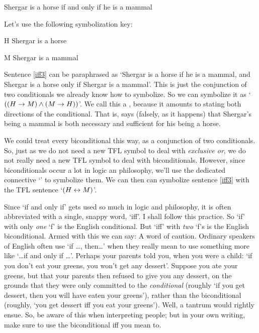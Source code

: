 	\begin{earg}
		\item[\ex{iff3}] Shergar is a horse if and only if he is a mammal
	\end{earg}
Let's use the following symbolization key:
	\begin{ekey}
		\item[H] Shergar is a horse
		\item[M] Shergar is a mammal
	\end{ekey}
Sentence \ref{iff3} can be paraphrased as `Shergar is a horse if he is a mammal, and Shergar is a horse only if Shergar is a mammal'. This is just the conjunction of two conditionals we already know how to symbolize.   So we can symbolize it as `$((H \rightarrow M) \wedge (M \rightarrow H))$'. We call this a , because it amounts to stating both directions of the conditional.  That is,  says (falsely, as it happens) that Shergar's being a mammal is both necessary and sufficient for his being a horse.

We could treat every biconditional this way, as a conjunction of two conditionals. So, just as we do not need a new TFL symbol to deal with \emph{exclusive or}, we do not really need a new TFL symbol to deal with biconditionals. However, since biconditionals occur a lot in logic an philosophy, we'll use the dedicated connective `\eiff' to symbolize them. We can then can symbolize sentence \ref{iff3} with the TFL sentence `$(H \leftrightarrow M)$'. 

Since `if and only if' gets used so much in logic and philosophy, it is often abbreviated with a single, snappy word, `iff'. I shall follow this practice. So `if' with only \emph{one} `f' is the English conditional. But `iff' with \emph{two} `f's is the English biconditional. Armed with this we can say:
A word of caution. Ordinary speakers of English often use `if \ldots, then\ldots' when they really mean to use something more like `\ldots if and only if \ldots'. Perhaps your parents told you, when you were a child: `if you don't eat your greens, you won't get any dessert'. Suppose you ate your greens, but that your parents then refused to give you any dessert, on the grounds that they were only committed to the \emph{conditional} (roughly `if you get dessert, then you will have eaten your greens'), rather than the biconditional (roughly, `you get dessert iff you eat your greens'). Well, a tantrum would rightly ensue. So, be aware of this when interpreting people; but in your own writing, make sure to use the biconditional iff you mean to.


